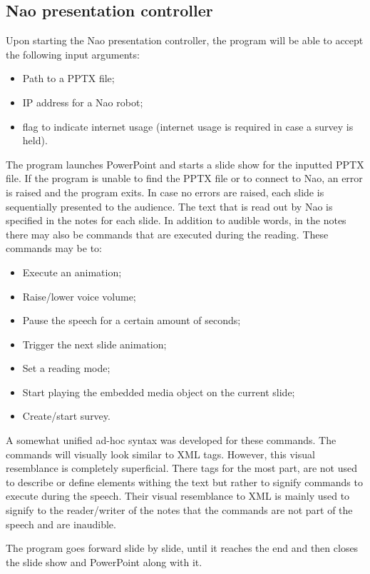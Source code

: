 \documentclass[12pt, fleqn, a4paper]{article}
\begin{document}
\subsection{Nao presentation controller}
Upon starting the Nao presentation controller, the program will be able to accept the following input arguments:
\begin{itemize}
	\item Path to a PPTX file;
	\item IP address for a Nao robot;
	\item flag to indicate internet usage (internet usage is required in case a survey is held).
\end{itemize}
The program launches PowerPoint and starts a slide show for the inputted PPTX file. If the program is unable to find the PPTX file or to connect to Nao, an error is raised and the program exits. In case no errors are raised, each slide is sequentially presented to the audience. The text that is read out by Nao is specified in the notes for each slide. In addition to audible words, in the notes there may also be commands that are executed during the reading. These commands may be to:
\begin{itemize}
	\item Execute an animation;
	\item Raise/lower voice volume;
	\item Pause the speech for a certain amount of seconds;
	\item Trigger the next slide animation;
	\item Set a reading mode;
	\item Start playing the embedded media object on the current slide;
	\item Create/start survey.
\end{itemize}
A somewhat unified ad-hoc syntax was developed for these commands. The commands will visually look similar to XML tags. However, this visual resemblance is completely superficial. There tags for the most part, are not used to describe or define elements withing the text but rather to signify commands to execute during the speech. 
Their visual resemblance to XML is mainly used to signify to the reader/writer of the notes that the commands are not part of the speech and are inaudible.\par
The program goes forward slide by slide, until it reaches the end and then closes the slide show and PowerPoint along with it.
\end{document}
